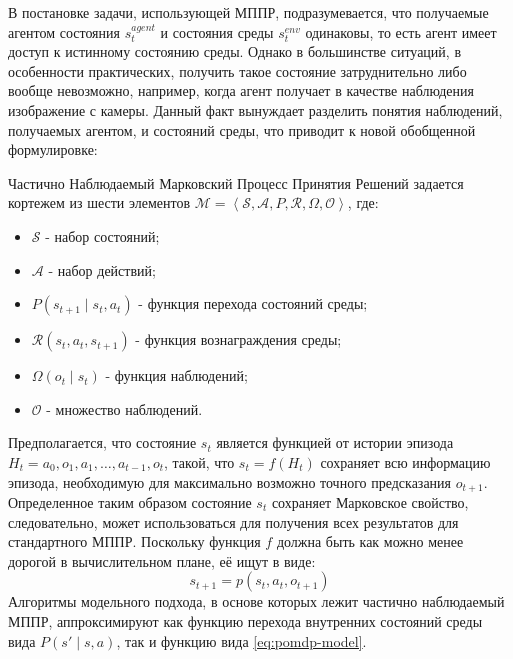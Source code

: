 В постановке задачи, использующей МППР, подразумевается, что получаемые агентом состояния $s_t^{agent}$ и состояния среды $s_t^{env}$ одинаковы, то есть агент имеет доступ к истинному состоянию среды.
Однако в большинстве ситуаций, в особенности практических, получить такое состояние затруднительно либо вообще невозможно, например, когда агент получает в качестве наблюдения изображение с камеры.
Данный факт вынуждает разделить понятия наблюдений, получаемых агентом, и состояний среды, что приводит к новой обобщенной формулировке: 
\begin{Def}
    Частично Наблюдаемый Марковский Процесс Принятия Решений задается кортежем из шести элементов $\mathcal{M} = \left<\mathcal{S}, \mathcal{A}, P, \mathcal{R}, \Omega, \mathcal{O} \right>$, где:
    \begin{itemize}
        \item $\mathcal{S}$ - набор состояний;
        \item $\mathcal{A}$ - набор действий;
        \item $P(s_{t+1} \mid s_t, a_t)$ - функция перехода состояний среды;
        \item $\mathcal{R}(s_t, a_t, s_{t+1})$ - функция вознаграждения среды;
        \item $\Omega(o_t \mid s_t)$ - функция наблюдений;
        \item $\mathcal{O}$ - множество наблюдений.
    \end{itemize}
    \label{pomdp}
\end{Def}

Предполагается, что состояние $s_t$ является функцией от истории эпизода $H_t = a_0, o_1, a_1, \dots, a_{t-1}, o_t$, такой, что $s_t = f(H_t)$ сохраняет всю информацию эпизода, необходимую для максимально возможно точного предсказания $o_{t+1}$. 
Определенное таким образом состояние $s_t$ сохраняет Марковское свойство, следовательно, может использоваться для получения всех результатов для стандартного МППР. 
Поскольку функция $f$ должна быть как можно менее дорогой в вычислительном плане, её ищут в виде:
\begin{equation}
\label{eq:pomdp-model}
    s_{t+1} = p(s_t, a_t, o_{t+1})
\end{equation}
Алгоритмы модельного подхода, в основе которых лежит частично наблюдаемый МППР, аппроксимируют как функцию перехода внутренних состояний среды вида 
$\mathit{P}(s' \mid s, a)$, так и функцию вида \ref{eq:pomdp-model}.

